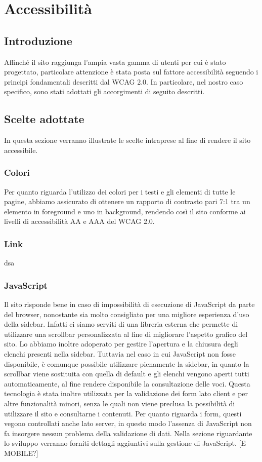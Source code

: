 \documentclass[12pt]{article}
\begin{document}
	\section{Accessibilità}
	\subsection{Introduzione}
	Affinché il sito raggiunga l'ampia vasta gamma di utenti per cui è stato progettato, particolare attenzione è stata posta sul fattore accessibilità seguendo i principi fondamentali descritti dal WCAG 2.0. In particolare, nel nostro caso specifico, sono stati adottati gli accorgimenti di seguito descritti.
	\subsection{Scelte adottate}
	In questa sezione verranno illustrate le scelte intraprese al fine di rendere il sito accessibile.
	\subsubsection{Colori}
	Per quanto riguarda l'utilizzo dei colori per i testi e gli elementi di tutte le pagine, abbiamo assicurato di ottenere un rapporto di contrasto pari 7:1 tra un elemento in foreground e uno in background, rendendo così il sito conforme ai livelli di accessibilità AA e AAA del WCAG 2.0. 
	\subsubsection{Link}
	dsa
	\subsubsection{JavaScript}
	Il sito risponde bene in caso di impossibilità di esecuzione di JavaScript da parte del browser, nonostante sia molto consigliato per una migliore esperienza d'uso della sidebar. Infatti ci siamo serviti di una libreria esterna che permette di utilizzare una scrollbar personalizzata al fine di migliorare l'aspetto grafico del sito. Lo abbiamo inoltre adoperato per gestire l'apertura e la chiusura degli elenchi presenti nella sidebar. Tuttavia nel caso in cui JavaScript non fosse disponibile, è comunque possibile utilizzare pienamente la sidebar, in quanto la scrollbar viene sostituita con quella di default e gli elenchi vengono aperti tutti automaticamente, al fine rendere disponibile la consultazione delle voci.
	Questa tecnologia è stata inoltre utilizzata per la validazione dei form lato client e per altre funzionalità minori, senza le quali non viene preclusa la possibilità di utilizzare il sito e consultarne i contenuti. Per quanto riguarda i form, questi vegono controllati anche lato server, in questo modo l'assenza di JavaScript non fa insorgere nessun problema della validazione di dati.	Nella sezione  riguardante lo sviluppo verranno forniti dettagli aggiuntivi sulla gestione di JavaScript.
	[E MOBILE?]
\end{document}
